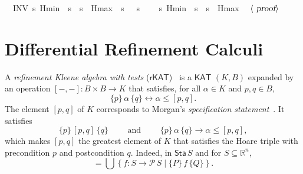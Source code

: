 \documentclass[envcountsame]{llncs}
\newcommand{\KAT}{\mathsf{KAT}}
\newcommand{\rKAT}{\mathsf{rKAT}}
\newcommand{\Pow}{\mathcal{P}}
\newcommand{\reals}{\mathbb{R}}
\newcommand{\sta}{\mathsf{Sta}}
\begin{document}
\begin{example}
\begin{isabellebody}
\ \ INV\ {\isacharparenleft}{\isasymlambda}s{\isachardot}\ Hmin\ {\isasymle}\ s{\isachardollar}{}\ {\isasymand}\ s{\isachardollar}{}\ {\isasymle}\ Hmax\ {\isasymand}\ {\isacharparenleft}s{\isachardollar}{}\ {\isacharequal}{}\ {\isasymor}\ s{\isachardollar}{}\ {\isacharequal}\ {}{\isacharparenright}{\isacharparenright}{\isacharparenright}\isanewline
\ \ {\isasymlceil}{\isasymlambda}s{\isachardot}\ Hmin\ {\isasymle}\ s{\isachardollar}{}\ {\isasymand}\ s{\isachardollar}{}\ {\isasymle}\ Hmax{\isasymrceil}{\isachardoublequoteclose}\isanewline
\ \ $\langle \isa{proof}\rangle$\isanewline
\end{isabellebody}
\end{example}


\section{Differential Refinement Calculi}\label{sec:refine}

A \emph{refinement Kleene algebra with tests}
($\rKAT$)~\cite{ArmstrongGS16}  is a $\KAT$
$(K,B)$ expanded by an operation $[-,-]:B\times B\to K$ that
satisfies, for all $\alpha \in K$ and $p,q\in B$, 
\begin{equation*}
  \{p\}\, \alpha\, \{q\} \leftrightarrow \alpha\le [p,q].
\end{equation*}
The element $[p,q]$ of $K$ corresponds to Morgan's \emph{specification
  statement}~\cite{Morgan94}. It satisfies
\begin{equation*}
  \{p\}\, [p,q]\, \{q\}\qquad \text{ and }\qquad \{p\}\, \alpha\, \{q\} \rightarrow \alpha\le [p,q],
\end{equation*}
which makes $[p,q]$ the greatest element of $K$ that satisfies the Hoare
triple with precondition $p$ and postcondition $q$.  Indeed, in
$\sta\, S$ and for $S\subseteq \reals^n$,
\begin{equation*}
  [P,Q] = \bigcup \left\{f:S\to \Pow\, S \mid \{P\}\, f\, \{Q\}\right\}.
\end{equation*}
\end{document}
